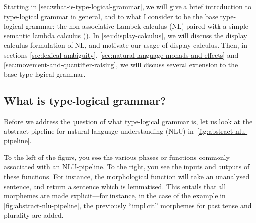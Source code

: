 Starting in \autoref{sec:what-is-type-logical-grammar}, we will give a
brief introduction to type-logical grammar in general, and to what I
consider to be the base type-logical grammar: the non-associative
Lambek calculus (NL) paired with a simple semantic lambda calculus
(\lamET).
In \autoref{sec:display-calculus}, we will discuss the display
calculus formulation of NL, and motivate our usage of display
calculus.
Then, in sections \ref{sec:lexical-ambiguity},
\ref{sec:natural-language-monads-and-effects} and
\ref{sec:movement-and-quantifier-raising}, we will discuss several
extension to the base type-logical grammar.

\subsection{What is type-logical grammar?}
\label{sec:what-is-type-logical-grammar}

Before we address the question of what type-logical grammar is, let us
look at the abstract pipeline for natural language understanding (NLU)
in~\autoref{fig:abstract-nlu-pipeline}.



To the left of the figure, you see the various phases or functions
commonly associated with an NLU-pipeline. To the right, you see the
inputs and outputs of these functions.
For instance, the morphological function will take an unanalysed
sentence, and return a sentence which is lemmatised. This entails that
all morphemes are made explicit---for instance, in the case of the
example in \autoref{fig:abstract-nlu-pipeline}, the previously
``implicit'' morphemes for past tense and plurality are added.

